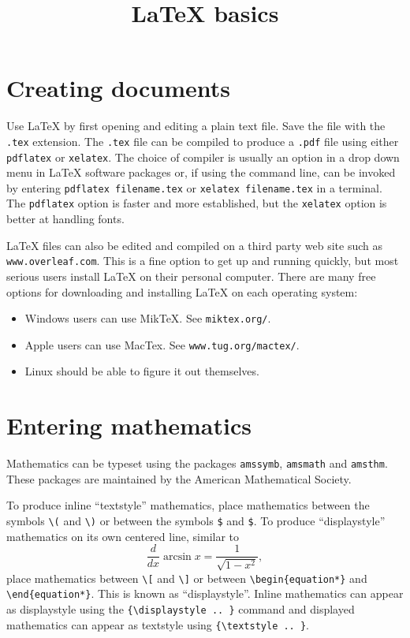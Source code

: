 \documentclass[11pt]{article}
\title{\LaTeX{} basics}
\date{}
\begin{document}
\maketitle

\section{Creating documents}

Use \LaTeX{} by first opening and editing a plain text file.  Save the file with the
\texttt{.tex} extension.  The \texttt{.tex} file can be compiled to produce a
\texttt{.pdf} file using either \texttt{pdflatex} or \texttt{xelatex}.  The choice of
compiler is usually an option in a drop down menu in \LaTeX{} software packages or, if
using the command line, can be invoked by entering \texttt{pdflatex filename.tex} or
\texttt{xelatex filename.tex} in a terminal.  The \texttt{pdflatex} option is faster and
more established, but the \texttt{xelatex} option is better at handling fonts.

\LaTeX{} files can also be edited and compiled on a third party web site such as
\texttt{www.overleaf.com}.  This is a fine option to get up and running quickly, but most
serious users install LaTeX on their personal computer.  There are many free options for
downloading and installing \LaTeX{} on each operating system:
\begin{itemize}
\item Windows users can use MikTeX.  See
  \texttt{miktex.org/}.

\item Apple users can use MacTex.  See
  \texttt{www.tug.org/mactex/}.

\item Linux should be able to figure it out themselves.
\end{itemize}

\section{Entering mathematics}

Mathematics can be typeset using the packages \texttt{amssymb},
\texttt{amsmath} and \texttt{amsthm}.  These packages are maintained by the
American Mathematical Society.

To produce inline ``textstyle'' mathematics, place mathematics between the
symbols \verb`\(` and \verb`\)` or between the symbols \verb`$` and \verb`$`.
To produce ``displaystyle'' mathematics on its own centered line, similar to
\begin{equation*}
  \frac{d}{dx} \arcsin x = \frac{1}{\sqrt{1 - x^2}},
\end{equation*}
place mathematics between \verb`\[` and \verb`\]` or between
\verb`\begin{equation*}` and \verb`\end{equation*}`.  This is known as
``displaystyle''.  Inline mathematics can appear as displaystyle using the
\verb!{\displaystyle .. }! command and displayed mathematics can appear as
textstyle using \verb`{\textstyle .. }`.
\end{document}
